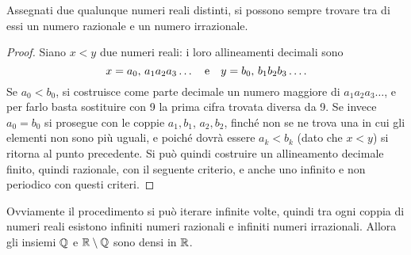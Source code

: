\begin{teorema}
Assegnati due qualunque numeri reali distinti, si possono sempre trovare tra di essi un numero razionale e un numero irrazionale.
\end{teorema}
\begin{proof}
Siano $x<y$ due numeri reali: i loro allineamenti decimali sono
\[
x=a_0,\,a_1a_2a_3\dots\quad\text{e}\quad y=b_0,\,b_1b_2b_3\dots.
\]
Se $a_0<b_0$, si costruisce come parte decimale un numero maggiore di $a_1a_2a_3\dots$, e per farlo basta sostituire con 9 la prima cifra trovata diversa da 9.
Se invece $a_0=b_0$ si prosegue con le coppie $a_1,b_1$, $a_2,b_2$, finché non se ne trova una in cui gli elementi non sono più uguali, e poiché dovrà essere $a_k<b_k$ (dato che $x<y$) si ritorna al punto precedente.
Si può quindi costruire un allineamento decimale finito, quindi razionale, con il seguente criterio, e anche uno infinito e non periodico con questi criteri.
\end{proof}
Ovviamente il procedimento si può iterare infinite volte, quindi tra ogni coppia di numeri reali esistono infiniti numeri razionali e infiniti numeri irrazionali. Allora gli insiemi $\mathbb{Q}$ e $\mathbb{R}\setminus\mathbb{Q}$ sono densi in $\mathbb{R}$.

